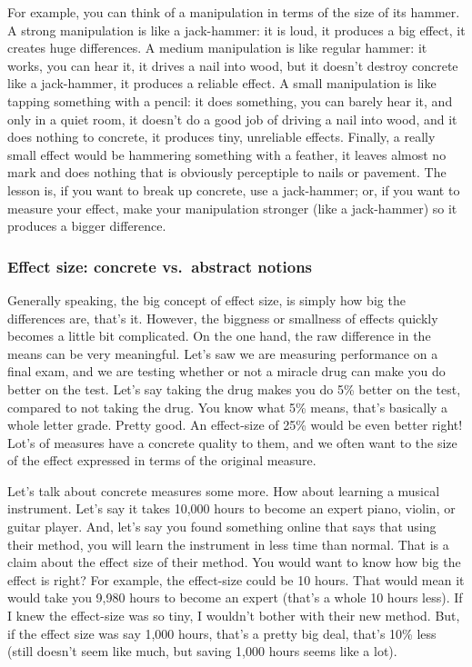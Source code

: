 \documentclass[
  letterpaper,
  DIV=11,
  numbers=noendperiod]{scrartcl}
\begin{document}
For example, you can think of a manipulation in terms of the size of its
hammer. A strong manipulation is like a jack-hammer: it is loud, it
produces a big effect, it creates huge differences. A medium
manipulation is like regular hammer: it works, you can hear it, it
drives a nail into wood, but it doesn't destroy concrete like a
jack-hammer, it produces a reliable effect. A small manipulation is like
tapping something with a pencil: it does something, you can barely hear
it, and only in a quiet room, it doesn't do a good job of driving a nail
into wood, and it does nothing to concrete, it produces tiny, unreliable
effects. Finally, a really small effect would be hammering something
with a feather, it leaves almost no mark and does nothing that is
obviously perceptiple to nails or pavement. The lesson is, if you want
to break up concrete, use a jack-hammer; or, if you want to measure your
effect, make your manipulation stronger (like a jack-hammer) so it
produces a bigger difference.

\hypertarget{effect-size-concrete-vs.-abstract-notions}{%
\subsubsection{Effect size: concrete vs.~abstract
notions}\label{effect-size-concrete-vs.-abstract-notions}}

Generally speaking, the big concept of effect size, is simply how big
the differences are, that's it. However, the biggness or smallness of
effects quickly becomes a little bit complicated. On the one hand, the
raw difference in the means can be very meaningful. Let's saw we are
measuring performance on a final exam, and we are testing whether or not
a miracle drug can make you do better on the test. Let's say taking the
drug makes you do 5\% better on the test, compared to not taking the
drug. You know what 5\% means, that's basically a whole letter grade.
Pretty good. An effect-size of 25\% would be even better right! Lot's of
measures have a concrete quality to them, and we often want to the size
of the effect expressed in terms of the original measure.

Let's talk about concrete measures some more. How about learning a
musical instrument. Let's say it takes 10,000 hours to become an expert
piano, violin, or guitar player. And, let's say you found something
online that says that using their method, you will learn the instrument
in less time than normal. That is a claim about the effect size of their
method. You would want to know how big the effect is right? For example,
the effect-size could be 10 hours. That would mean it would take you
9,980 hours to become an expert (that's a whole 10 hours less). If I
knew the effect-size was so tiny, I wouldn't bother with their new
method. But, if the effect size was say 1,000 hours, that's a pretty big
deal, that's 10\% less (still doesn't seem like much, but saving 1,000
hours seems like a lot).
\end{document}
